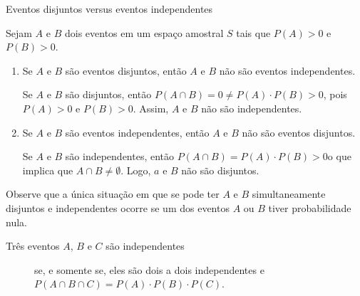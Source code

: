 \begin{example} {Eventos disjuntos versus eventos independentes}

Sejam \(A\) e \(B\) dois eventos em um espaço amostral \(S\) tais que \(P(A)>0\) e \(P(B)>0\).
\begin{enumerate}
\item {} 
Se \(A\) e \(B\) são eventos disjuntos, então \(A\) e \(B\) não são eventos independentes.

Se \(A\) e \(B\) são disjuntos, então \(P(A\cap B)=0\neq P(A)\cdot P(B)>0\), pois \(P(A)>0\) e \(P(B)>0\). Assim, \(A\) e \(B\) não são independentes.

\item {} 
Se \(A\) e \(B\) são eventos independentes, então $A$ e $B$ não são eventos disjuntos.

Se \(A\) e \(B\) são independentes, então \(P(A\cap B)=P(A)\cdot P(B)>0\)o que implica que \(A\cap B\neq \emptyset\). Logo, \(a\) e \(B\) não são disjuntos.

\end{enumerate}

Observe que a única situação em que se pode ter \(A\)  e \(B\)  simultaneamente disjuntos e independentes ocorre se um dos eventos \(A\) ou \(B\) tiver probabilidade nula.
\end{example}

\begin{description}

\item[Três eventos \(A\), \(B\)  e  \(C\) são independentes] se, e somente se, eles são dois a dois independentes e \(P(A\cap B\cap C)=P(A)\cdot P(B)\cdot P(C)\).
\end{description}

